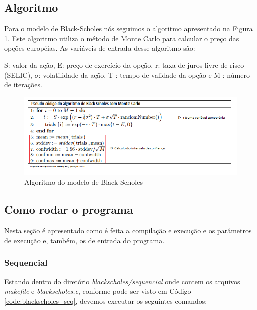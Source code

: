 \documentclass[11pt,twoside]{article}
\begin{document}
    \subsection{Algoritmo}
    
        Para o modelo de Black-Scholes nós seguimos o algoritmo apresentado na Figura
        \ref{img:blackscholes}. Este algoritmo utiliza o método de
        Monte Carlo para calcular o preço das opções européias. As variáveis de entrada desse
        algoritmo são: 
        
        S: valor da ação,
        E: preço de exercício da opção,
        r: taxa de juros livre de risco (SELIC),
        $\sigma$: volatilidade da ação,
        T : tempo de validade da opção e 
        M : número de iterações.
    
        \begin{figure}[H]
            \centering
        	\includegraphics[scale=0.6]{figures/blackscholes.png}
    		\caption{Algoritmo do modelo de Black Scholes}
    		\label{img:blackscholes}
    	\end{figure}

\subsection{Como rodar o programa}
    
    Nesta seção é apresentado como é feita a compilação e execução e os parâmetros de execução
    e, também, os de entrada do programa.
    
    \subsubsection{Sequencial}
        Estando dentro do diretório {\it blackscholes/sequencial} onde contem os
        arquivos {\it makefile} e {\it blackscholes.c}, conforme pode ser visto em
        Código \ref{code:blackscholes_seq}, devemos executar os seguintes comandos:\\
        
\end{document}
